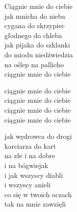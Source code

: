 \begin{text}
    Ciągnie mnie do ciebie\\
    jak mnicha do nieba\\
    cygana do skrzypiec\\
    głodnego do chleba\\
    jak pijaka do szklanki\\
    do miodu niedźwiedzia\\
    na oślep na pallicho\\
    ciągnie mnie do ciebie

    ciągnie mnie do ciebie\\
    ciągnie mnie do ciebie\\
    ciągnie mnie do ciebie\\
    ciągnie mnie do ciebie

    jak wędrowca do drogi\\
    karciarza do kart\\
    na złe i na dobre\\
    i na bógwiejak\\
    i jak wszyscy diabli\\
    i wszyscy anieli\\
    co się w twoich oczach\\
    tak na mnie zawzięli
\end{text}
\begin{chord}

\end{chord}
